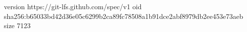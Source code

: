 version https://git-lfs.github.com/spec/v1
oid sha256:b65033bd42d36e05c6299b2ca89fc78508a1b91dce2abf8979db2ee453e73aeb
size 7123
